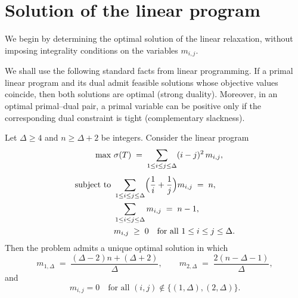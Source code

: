 \documentclass[preprint,12pt]{elsarticle}
\begin{document}

\section{Solution of the linear program}

We begin by determining the optimal solution of the linear relaxation,
without imposing integrality conditions on the variables $m_{i,j}$.



\begin{remark}
We shall use the following standard facts from linear programming.
If a primal linear program and its dual admit feasible solutions whose
objective values coincide, then both solutions are optimal (strong duality).
Moreover, in an optimal primal--dual pair, a primal variable can be positive
only if the corresponding dual constraint is tight (complementary slackness).
\end{remark}





\begin{theorem}
\label{thm:SO-LP-1-Delta}
Let $\Delta\ge 4$ and $n\ge \Delta+2$ be integers. Consider the linear program
\begin{align}
\max\ & \sigma(T) \;=\; \sum_{1\le i\le j\le \Delta} (i-j)^2\, m_{i,j},
\label{eq:primal-objective}\\[1ex]
\text{subject to }&
\sum_{1\le i\le j\le \Delta} \Bigl(\frac{1}{i}+\frac{1}{j}\Bigr) m_{i,j} \;=\; n,
\label{eq:primal-constraint-w}\\
&
\sum_{1\le i\le j\le \Delta} m_{i,j} \;=\; n-1,
\label{eq:primal-constraint-sum}\\
&
m_{i,j}\;\ge\; 0
\quad\text{for all }1\le i\le j\le \Delta.
\label{eq:primal-nonneg}
\end{align}
Then the problem admits a unique optimal solution in which
\[
m_{1,\Delta} \;=\; \frac{(\Delta-2)n + (\Delta+2)}{\Delta}, 
\qquad
m_{2,\Delta} \;=\; \frac{2(n-\Delta-1)}{\Delta},
\]
and
\[
m_{i,j}=0 \quad\text{for all } (i,j)\notin\{(1,\Delta),(2,\Delta)\}.
\]
\end{theorem}
\end{document}
